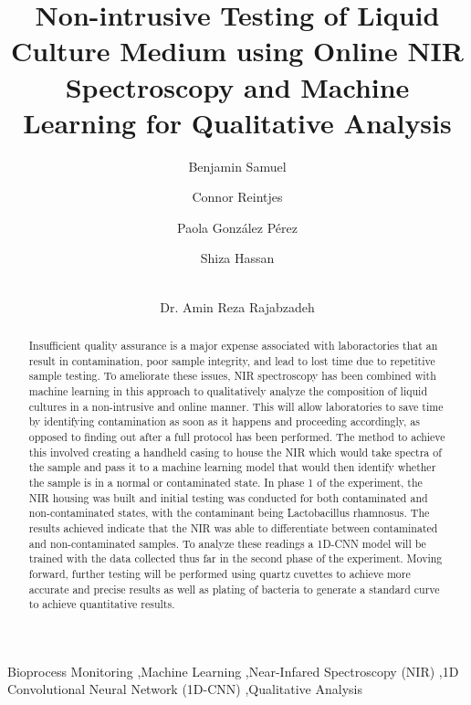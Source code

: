 \documentclass[final, 3p, 11pt]{elsarticle}
\begin{document}
\begin{frontmatter}


\title{Non-intrusive Testing of Liquid Culture Medium using Online NIR Spectroscopy and Machine Learning for Qualitative Analysis}

\author[1]{Benjamin Samuel}
\author[1]{Connor Reintjes}
\author[1]{Paola Gonz\'alez P\'erez}
\author[1]{Shiza Hassan}
\author[1]{\\Dr. Amin Reza Rajabzadeh} %



\begin{abstract}
Insufficient quality assurance is a major expense associated with laboractories that an result in contamination, poor sample integrity, and lead to lost time due to repetitive sample testing. To ameliorate these issues, NIR spectroscopy has been combined with machine learning in this approach to qualitatively analyze the composition of liquid cultures in a non-intrusive and online manner. This will allow laboratories to save time by identifying contamination as soon as it happens and proceeding accordingly, as opposed to finding out after a full protocol has been performed. The method to achieve this involved creating a handheld casing to house the NIR which would take spectra of the sample and pass it to a machine learning model that would then identify whether the sample is in a normal or contaminated state. In phase 1 of the experiment, the NIR housing was built and initial testing was conducted for both contaminated and non-contaminated states, with the contaminant being Lactobacillus rhamnosus. The results achieved indicate that the NIR was able to differentiate between contaminated and non-contaminated samples. To analyze these readings a 1D-CNN model will be trained with the data collected thus far in the second phase of the experiment. Moving forward, further testing will be performed using quartz cuvettes to achieve more accurate and precise results as well as plating of bacteria to generate a standard curve to achieve quantitative results. 

\end{abstract}

\begin{keyword}
Bioprocess Monitoring \sep Machine Learning \sep Near-Infared Spectroscopy (NIR) \sep 1D Convolutional Neural Network (1D-CNN) \sep Qualitative Analysis
\end{keyword}

\end{frontmatter}
\end{document}
